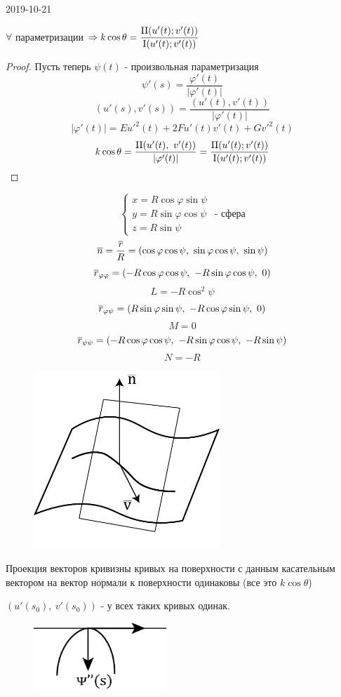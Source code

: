\documentclass[main]{subfiles}
\begin{document}
\begin{lect} {2019-10-21}
		\begin{theorem}
			$\forall$ параметризации $\Ra k \cos \theta = \dfrac{\RNumb{2} (u'(t); v'(t))}{\RNumb{1} (u'(t); v'(t))}$
		\end{theorem}
		\begin{proof}
			Пусть теперь $\psi(t)$ - произвольная параметризация
			\[\psi'(s) = \dfrac{\varphi'(t)}{|\varphi'(t)|}\]
			\[(u'(s), v'(s)) = \dfrac{(u'(t), v'(t))}{|\varphi'(t)|}\]
			\[|\varphi'(t)| = E u'^2(t) + 2F u'(t) v'(t) + G v'^2(t)\]
			\[k \cos \theta = \dfrac{\RNumb{2} (u'(t),\ v'(t))}{|\varphi'(t)|} = \dfrac{\RNumb{2} (u'(t); v'(t))}{\RNumb{1} (u'(t); v'(t))}\]
		\end{proof}

		\begin{Example}
			\[\begin{cases}
				x = R \cos \varphi \sin \psi\\
				y = R \sin \varphi \cos \psi\\
				z = R \sin \psi
			\end{cases} \text{ - сфера}\]
			\[\overline{n} = \dfrac{\overline{r}}{R} = (\cos \varphi \cos \psi,\ \sin \varphi \cos \psi,\ \sin \psi)\]
			\[\overline{r}_{\varphi \varphi} = (-R \cos \varphi \cos \psi,\ -R \sin \varphi \cos \psi,\ 0)\]
			\[L = -R \cos^2 \psi\]
			\[\overline{r}_{\varphi \psi} = (R \sin \varphi \sin \psi,\ -R \cos \varphi \sin \psi,\ 0)\]
			\[M = 0\]
			\[\overline{r}_{\psi \psi} = (-R \cos \varphi \cos \psi,\ -R \sin \varphi \cos \psi,\ -R \sin \psi)\]
			\[N = -R\]
		\end{Example}

		\begin{figure}[H]
			\centering
			\includegraphics[width=7cm]{pics/7_7.png}
		\end{figure}
		\begin{theorem}[Мёнье?]
			Проекция векторов кривизны кривых на поверхности с данным касательным вектором на вектор нормали к поверхности одинаковы (все это $k \cos \theta$)
		\end{theorem}
		$(u'(s_0),\ v'(s_0)) \text{ - у всех таких кривых одинак.}$
		\begin{figure}[H]
			\centering
			\includegraphics[width=5cm]{pics/7_8.png}
		\end{figure}


\end{lect}
\end{document}
